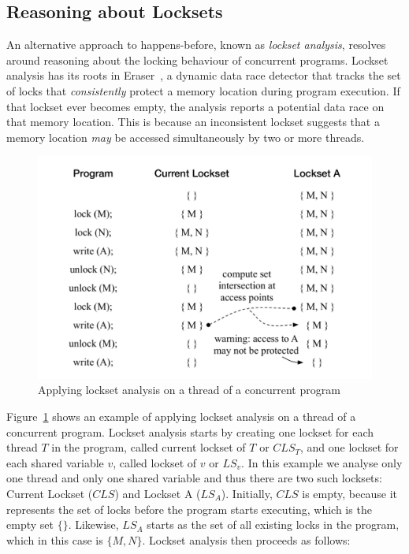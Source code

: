 \subsection{Reasoning about Locksets}
\label{bg:lockset}

An alternative approach to happens-before, known as \emph{lockset analysis}, resolves around reasoning about the locking behaviour of concurrent programs. Lockset analysis has its roots in Eraser~\cite{savage1997eraser}, a dynamic data race detector that tracks the set of locks that \emph{consistently} protect a memory location during program execution. If that lockset ever becomes empty, the analysis reports a potential data race on that memory location. This is because an inconsistent lockset suggests that a memory location \emph{may} be accessed simultaneously by two or more threads.

\begin{figure}[htbp]
\centering
\includegraphics[width=1\linewidth]{img/lockset.pdf}
\caption{Applying lockset analysis on a thread of a concurrent program}
\label{fig:locksets}
\end{figure}

Figure~\ref{fig:locksets} shows an example of applying lockset analysis on a thread of a concurrent program. Lockset analysis starts by creating one lockset for each thread $T$ in the program, called current lockset of $T$ or $CLS_T$, and one lockset for each shared variable $v$, called lockset of $v$ or $LS_v$. In this example we analyse only one thread and only one shared variable and thus there are two such locksets: Current Lockset ($CLS$) and Lockset A ($LS_A$). Initially, $CLS$ is empty, because it represents the set of locks before the program starts executing, which is the empty set $\{ \}$. Likewise, $LS_A$ starts as the set of all existing locks in the program, which in this case is $\{M, N\}$. Lockset analysis then proceeds as follows:

